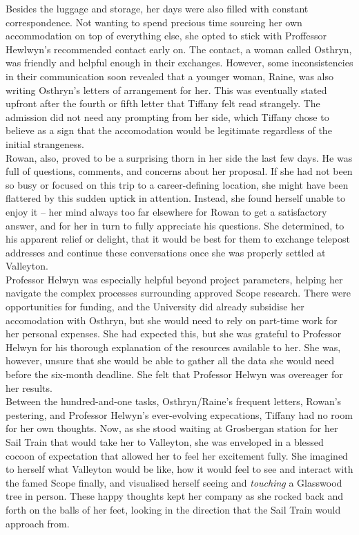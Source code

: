 Besides the luggage and storage, her days were also filled with constant correspondence.
Not wanting to spend precious time sourcing her own accommodation on top of everything else, she opted to stick with Proffessor Hewlwyn's recommended contact early on.
The contact, a woman called Osthryn, was friendly and helpful enough in their exchanges.
However, some inconsistencies in their communication soon revealed that a younger woman, Raine, was also writing Osthryn's letters of arrangement for her.
This was eventually stated upfront after the fourth or fifth letter that Tiffany felt read strangely.
The admission did not need any prompting from her side, which Tiffany chose to believe as a sign that the accomodation would be legitimate regardless of the initial strangeness.\\

Rowan, also, proved to be a surprising thorn in her side the last few days.
He was full of questions, comments, and concerns about her proposal. 
If she had not been so busy or focused on this trip to a career-defining location, she might have been flattered by this sudden uptick in attention.
Instead, she found herself unable to enjoy it -- her mind always too far elsewhere for Rowan to get a satisfactory answer, and for her in turn to fully appreciate his questions.
She determined, to his apparent relief or delight, that it would be best for them to exchange telepost addresses and continue these conversations once she was properly settled at Valleyton.\\

Professor Helwyn was especially helpful beyond project parameters, helping her navigate the complex processes surrounding approved Scope research.
There were opportunities for funding, and the University did already subsidise her accomodation with Osthryn, but she would need to rely on part-time work for her personal expenses.
She had expected this, but she was grateful to Professor Helwyn for his thorough explanation of the resources available to her.
She was, however, unsure that she would be able to gather all the data she would need before the six-month deadline.
She felt that Professor Helwyn was overeager for her results.\\

Between the hundred-and-one tasks, Osthryn/Raine's frequent letters, Rowan's pestering, and Professor Helwyn's ever-evolving expecations, Tiffany had no room for her own thoughts.
Now, as she stood waiting at Grosbergan station for her Sail Train that would take her to Valleyton, she was enveloped in a blessed cocoon of expectation that allowed her to feel her excitement fully.
She imagined to herself what Valleyton would be like, how it would feel to see and interact with the famed Scope finally, and visualised herself seeing and \textit{touching} a Glasswood tree in person.
These happy thoughts kept her company as she rocked back and forth on the balls of her feet, looking in the direction that the Sail Train would approach from.\\

